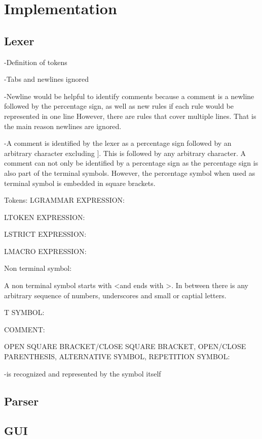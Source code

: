 

\chapter{Implementation}\label{cha:Implementation}

\section{Lexer}\label{sec:ImplementationLexer}

-Definition of tokens 

-Tabs and newlines ignored

-Newline would be helpful to identify comments because a comment is a newline followed by the percentage sign, as well as new rules if each rule would be represented in one line
However, there are rules that cover multiple lines. That is the main reason newlines are ignored. 

-A comment is identified by the lexer as a percentage sign followed by an arbitrary character excluding \dq ]\dq. This is followed by any arbitrary character. A comment can not only be identified by a percentage sign as the percentage sign is also part of the terminal symbols. However, the percentage symbol when used as terminal symbol is embedded in square brackets. 

Tokens:
LGRAMMAR EXPRESSION:

LTOKEN EXPRESSION:

LSTRICT EXPRESSION:

LMACRO EXPRESSION:

Non terminal symbol:

A non terminal symbol starts with \dq <\dq and ends with \dq >\dq. In between there is any arbitrary sequence of numbers, underscores and small or captial letters.

T SYMBOL:

COMMENT:
        

OPEN SQUARE BRACKET/CLOSE SQUARE BRACKET, OPEN/CLOSE PARENTHESIS, ALTERNATIVE SYMBOL, REPETITION SYMBOL:

-is recognized and represented by the symbol itself




\section{Parser}\label{sec:ImplementationParser}

\section{GUI}\label{sec:GUI}
